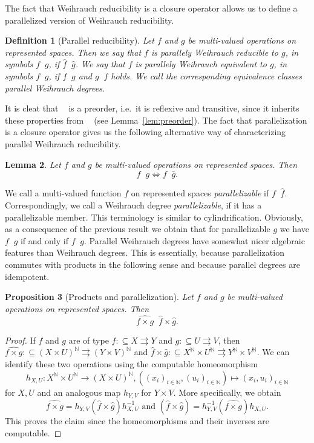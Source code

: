 \documentclass[jsl,10pt]{noasl}
\def\IN{{\mathbb{N}}}
\def\In{\subseteq}
\def\mto{\rightrightarrows}
\def\leqW{\mathop{\leq_{\mathrm{W}}}}
\def\equivW{\mathop{\equiv_{\mathrm{W}}}}
\def\equivSW{\mathop{\equiv_{\mathrm{sW}}}}
\def\leqPW{\mathop{\leq_{\widehat{\mathrm{W}}}}}
\def\equivPW{\mathop{\equiv_{\widehat{\mathrm{W}}}}}
\newtheorem{proposition}{Proposition}[section]
\newtheorem{lemma}[proposition]{Lemma}
\newtheorem{definition}[proposition]{Definition}
\begin{document}
The fact that Weihrauch reducibility is a closure operator allows
us to define a parallelized version of Weihrauch reducibility.

\begin{definition}[Parallel reducibility]\rm
Let $f$ and $g$ be multi-valued operations on represented spaces.
Then we say that $f$ is {\em parallely Weihrauch reducible} to $g$, 
in symbols $f\leqPW g$, if $\widehat{f}\leqW\widehat{g}$.
We say that $f$ is {\em parallely Weihrauch equivalent} to $g$, in symbols
$f\equivPW g$, if $f\leqPW g$ and $g\leqPW f$ holds.
We call the corresponding equivalence classes {\em parallel Weihrauch degrees}.
\end{definition}

It is cleat that $\leqPW$ is a preorder, i.e.\ it is reflexive and transitive,
since it inherits these properties from $\leqW$ (see Lemma~\ref{lem:preorder}).
The fact that parallelization is a closure operator gives us the following
alternative way of characterizing parallel Weihrauch reducibility.

\begin{lemma}
Let $f$ and $g$ be multi-valued operations on represented spaces.
Then
\[f\leqPW g\iff f\leqW\widehat{g}.\]
\end{lemma}

We call a multi-valued function $f$ on represented spaces {\em parallelizable}
if $f\equivW\widehat{f}$. Correspondingly, we call a Weihrauch degree {\em parallelizable},
if it has a parallelizable member. This terminology is similar to cylindrification.
Obviously, as a consequence of the previous result we obtain that
for parallelizable $g$ we have $f\leqW g$ if and only if $f\leqPW g$.
Parallel Weihrauch degrees have somewhat nicer algebraic features
than Weihrauch degrees. This is essentially, because parallelization
commutes with products in the following sense and because parallel degrees are idempotent.

\begin{proposition}[Products and parallelization]
\label{prop:product-parallelization}
Let $f$ and $g$ be multi-valued operations on represented spaces. Then
\[\widehat{f\times g}\equivSW\widehat{f}\times\widehat{g}.\]
\end{proposition}
\begin{proof}
 If $f$ and $g$
are of type $f:\In X\mto Y$ and $g:\In U\mto V$, then $\widehat{f\times g}:\In (X\times U)^\IN\mto (Y\times V)^\IN$ and 
$\widehat{f}\times\widehat{g}:\In X^\IN\times U^\IN\mto Y^\IN\times V^\IN$.
We can identify these two operations using the computable homeomorphism
\[h_{X,U}:X^\IN\times U^\IN\to (X\times U)^\IN,((x_i)_{i\in\IN},(u_i)_{i\in\IN})\mapsto(x_i,u_i)_{i\in\IN}\]
for $X,U$ and an analogous map $h_{Y,V}$ for $Y\times V$.
More specifically, we obtain
\[\widehat{f\times g}=h_{Y,V}(\widehat{f}\times\widehat{g})h_{X,U}^{-1}\mbox{ and }
  (\widehat{f}\times\widehat{g})=h_{Y,V}^{-1}(\widehat{f\times g})h_{X,U}.
\]
This proves the claim since the homeomorphisms and their inverses are computable.
\end{proof}
\end{document}
